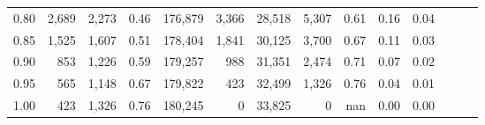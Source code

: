 \begin{tabular}{rrrrrrrrrrrrrr}
0.80 &   2,689 &  2,273 &  0.46 &  176,879 &    3,366 &  28,518 &   5,307 &  0.61 &  0.16 &      0.04 \\
0.85 &   1,525 &  1,607 &  0.51 &  178,404 &    1,841 &  30,125 &   3,700 &  0.67 &  0.11 &      0.03 \\
0.90 &     853 &  1,226 &  0.59 &  179,257 &      988 &  31,351 &   2,474 &  0.71 &  0.07 &      0.02 \\
0.95 &     565 &  1,148 &  0.67 &  179,822 &      423 &  32,499 &   1,326 &  0.76 &  0.04 &      0.01 \\
1.00 &     423 &  1,326 &  0.76 &  180,245 &        0 &  33,825 &       0 &   nan &  0.00 &      0.00 \\
\bottomrule
\end{tabular}
